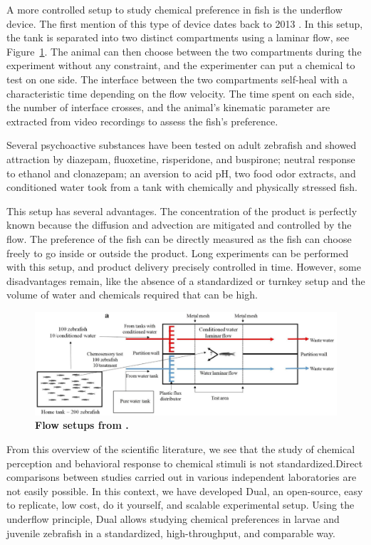    A more controlled setup to study chemical preference in fish is the underflow device. The first mention of this type of device dates back to 2013 \cite{readman2013fish}. In this setup, the tank is separated into two distinct compartments using a laminar flow, see Figure~\ref{flow_0_setup}. The animal can then choose between the two compartments during the experiment without any constraint, and the experimenter can put a chemical to test on one side. The interface between the two compartments self-heal with a characteristic time depending on the flow velocity. The time spent on each side, the number of interface crosses, and the animal's kinematic parameter are extracted from video recordings to assess the fish's preference.

    Several psychoactive substances have been tested on adult zebrafish \cite{abreu2016acute, abreu2016behavioral} and showed attraction by diazepam, fluoxetine, risperidone, and buspirone; neutral response to ethanol and clonazepam; an aversion to acid pH, two food odor extracts, and conditioned water took from a tank with chemically and physically stressed fish.

    This setup has several advantages. The concentration of the product is perfectly known because the diffusion and advection are mitigated and controlled by the flow. The preference of the fish can be directly measured as the fish can choose freely to go inside or outside the product. Long experiments can be performed with this setup, and product delivery precisely controlled in time. However, some disadvantages remain, like the absence of a standardized or turnkey setup and the volume of water and chemicals required that can be high.

    \begin{figure}[h]
      \centering
      \includegraphics[width=1\textwidth]{part_2/assets/flow_0.png}
      \caption{\textbf{Flow setups from \cite{abreu2016behavioral}.}}
      \label{flow_0_setup}
    \end{figure}

    From this overview of the scientific literature, we see that the study of chemical perception and behavioral response to chemical stimuli is not standardized.Direct comparisons between studies carried out in various independent laboratories are not easily possible. In this context, we have developed Dual, an open-source, easy to replicate, low cost, do it yourself, and scalable experimental setup. Using the underflow principle, Dual allows studying chemical preferences in larvae and juvenile zebrafish in a standardized, high-throughput, and comparable way.

